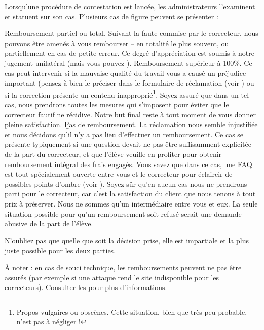 ﻿Lorsqu'une procédure de contestation est lancée, les administrateurs l'examinent et statuent sur son cas. Plusieurs cas de figure peuvent se présenter :

\begin{itemize}
\li \b{Remboursement partiel ou total.} Suivant la faute commise par le correcteur, nous pouvons être amenés à vous rembourser -- en totalité le plus souvent, ou partiellement en cas de petite erreur. Ce degré d'appréciation est soumis à notre jugement unilatéral (mais vous pouvez ).
\li \b{Remboursement supérieur à 100\%.} Ce cas peut intervenir si la mauvaise qualité du travail vous a causé un préjudice important (pensez à bien le préciser dans le formulaire de réclamation (voir ) ou si la correction présente un contenu inapproprié\footnote{Propos vulgaires ou obscènes. Cette situation, bien que très peu probable, n'est pas à négliger !}. Soyez assuré que dans un tel cas, nous prendrons toutes les mesures qui s'imposent pour éviter que le correcteur fautif ne récidive. Notre but final reste à tout moment de vous donner pleine satisfaction.
\li \b{Pas de remboursement.} La réclamation nous semble injustifiée et nous décidons qu'il n'y a pas lieu d'effectuer un remboursement. Ce cas se présente typiquement si une question devait ne pas être suffisamment explicitée de la part du correcteur, et que l'élève veuille en profiter pour obtenir remboursement intégral des frais engagés. Vous savez que dans ce cas, une FAQ est tout spécialement ouverte entre vous et le correcteur pour éclaircir de possibles points d'ombre (voir ). Soyez sûr qu'en aucun cas nous ne prendrons parti pour le correcteur, car c'est la satisfaction du client que nous tenons à tout prix à préserver. Nous ne sommes qu'un intermédiaire entre vous et eux. La seule situation possible pour qu'un remboursement soit refusé serait une demande abusive de la part de l'élève.
\end{itemize}

N'oubliez pas que quelle que soit la décision prise, elle est impartiale et la plus juste possible pour les deux parties.

À noter : en cas de souci technique, les remboursements peuvent ne pas être assurés (par exemple si une attaque rend le site indisponible pour les correcteurs). Consulter les  pour plus d'informations.
